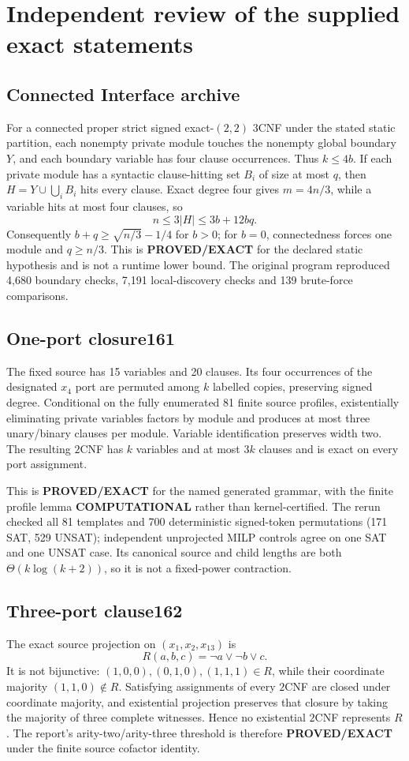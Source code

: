 \documentclass[11pt]{article}
\begin{document}
\section{Independent review of the supplied exact statements}
\subsection{Connected Interface archive}
For a connected proper strict signed exact-$(2,2)$ 3CNF under the stated
static partition, each nonempty private module touches the nonempty global
boundary $Y$, and each boundary variable has four clause occurrences.  Thus
$k\le4b$.  If each private module has a syntactic clause-hitting set $B_i$ of
size at most $q$, then $H=Y\cup\bigcup_iB_i$ hits every clause.  Exact degree
four gives $m=4n/3$, while a variable hits at most four clauses, so
\[
 n\le3|H|\le3b+12bq.
\]
Consequently $b+q\ge\sqrt{n/3}-1/4$ for $b>0$; for $b=0$, connectedness
forces one module and $q\ge n/3$.  This is \textbf{PROVED/EXACT} for the
declared static hypothesis and is not a runtime lower bound.  The original
program reproduced 4,680 boundary checks, 7,191 local-discovery checks and
139 brute-force comparisons.

\subsection{One-port closure161}
The fixed source has 15 variables and 20 clauses.  Its four occurrences of
the designated $x_4$ port are permuted among $k$ labelled copies, preserving
signed degree.  Conditional on the fully enumerated 81 finite source
profiles, existentially eliminating private variables factors by module and
produces at most three unary/binary clauses per module.  Variable
identification preserves width two.  The resulting $2$CNF has $k$ variables
and at most $3k$ clauses and is exact on every port assignment.

This is \textbf{PROVED/EXACT} for the named generated grammar, with the
finite profile lemma \textbf{COMPUTATIONAL} rather than kernel-certified.
The rerun checked all 81 templates and 700 deterministic signed-token
permutations (171 SAT, 529 UNSAT); independent unprojected MILP controls agree
on one SAT and one UNSAT case.  Its canonical source and child lengths are
both $\Theta(k\log(k+2))$, so it is not a fixed-power contraction.

\subsection{Three-port clause162}
The exact source projection on $(x_1,x_2,x_{13})$ is
\[
 R(a,b,c)=\neg a\lor\neg b\lor c.
\]
It is not bijunctive: $(1,0,0),(0,1,0),(1,1,1)\in R$, while their coordinate
majority $(1,1,0)\notin R$.  Satisfying assignments of every $2$CNF are
closed under coordinate majority, and existential projection preserves that
closure by taking the majority of three complete witnesses.  Hence no
existential $2$CNF represents $R$.  The report's arity-two/arity-three
threshold is therefore \textbf{PROVED/EXACT} under the finite source
cofactor identity.
\end{document}
